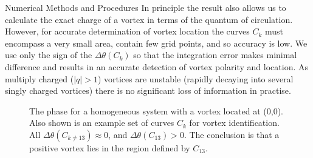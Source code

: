 \begin{chapter}{\label{cha:numerics}Numerical Methods and Procedures}
In principle the result also allows us to calculate the exact charge of a vortex in terms of the quantum of circulation. However, for accurate determination of vortex location the curves $C_k$ must encompass a very small area, contain few grid points, and so accuracy is low. We use only the sign of the $\Delta\theta(C_k)$ so that the integration error makes minimal difference and results in an accurate detection of vortex polarity and location. As multiply charged ($|q|>1$) vortices are unstable (rapidly decaying into several singly charged vortices) there is no significant loss of information in practise.
\begin{figure}
  \centering
  \caption{\label{fig:vort_detect_simple}The phase for a homogeneous system with a vortex located at (0,0). Also shown is an example set of curves $C_k$ for vortex identification. All $\Delta\theta(C_{k\neq13})\approx0$, and $\Delta\theta(C_{13})>0$. The conclusion is that a positive vortex lies in the region defined by $C_{13}$.}
 \end{figure}

\end{chapter}
